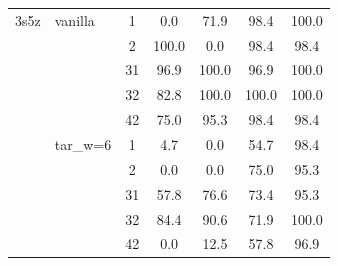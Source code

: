 \begin{table}[t]
\begin{tabular}{llccccc}
\midrule
3s5z & vanilla & 1 & 0.0 & 71.9 & 98.4 & 100.0 \\
 &  & 2 & 100.0 & 0.0 & 98.4 & 98.4 \\
 &  & 31 & 96.9 & 100.0 & 96.9 & 100.0 \\
 &  & 32 & 82.8 & 100.0 & 100.0 & 100.0 \\
 &  & 42 & 75.0 & 95.3 & 98.4 & 98.4 \\
 & tar_w=6 & 1 & 4.7 & 0.0 & 54.7 & 98.4 \\
 &  & 2 & 0.0 & 0.0 & 75.0 & 95.3 \\
 &  & 31 & 57.8 & 76.6 & 73.4 & 95.3 \\
 &  & 32 & 84.4 & 90.6 & 71.9 & 100.0 \\
 &  & 42 & 0.0 & 12.5 & 57.8 & 96.9 \\
\bottomrule
\end{tabular}
\end{table}